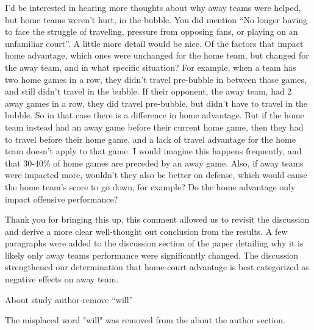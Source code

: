 \documentclass[12pt]{article}
\newenvironment{comment}%
{\begin{quoting}\noindent\small\it\ignorespaces%
  }{\end{quoting}}
\begin{document}
\begin{comment}
I’d be interested in hearing more thoughts about why away teams were helped, but home teams weren’t
hurt, in the bubble. You did mention “No longer having to face the struggle of traveling, pressure from
opposing fans, or playing on an unfamiliar court”. A little more detail would be nice. Of the factors that
impact home advantage, which ones were unchanged for the home team, but changed for the away team,
and in what specific situation?
For example, when a team has two home games in a row, they didn’t travel pre-bubble in between those
games, and still didn’t travel in the bubble. If their opponent, the away team, had 2 away games in a row,
they did travel pre-bubble, but didn’t have to travel in the bubble. So in that case there is a difference in
home advantage.
But if the home team instead had an away game before their current home game, then they had to travel
before their home game, and a lack of travel advantage for the home team doesn’t apply to that game. I
would imagine this happens frequently, and that 30-40\% of home games are preceded by an away game.
Also, if away teams were impacted more, wouldn’t they also be better on defense, which would cause the
home team’s score to go down, for example? Do the home advantage only impact offensive performance?
\end{comment}

 Thank you for bringing this up, this comment allowed us to revisit the discussion and derive a more clear well-thought out conclusion from the results. A few paragraphs were added to the discussion section of the paper detailing why it is likely only away teams performance were significantly changed. The discussion strengthened our determination that home-court advantage is best categorized as negative effects on away team.

\begin{comment}
About study author-remove “will”
\end{comment}

The misplaced word "will" was removed from the about the author section.




\end{document}
